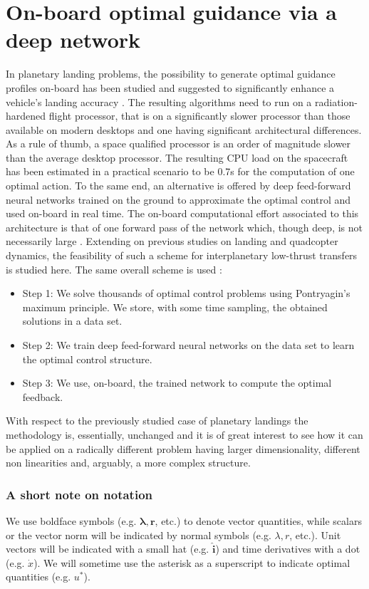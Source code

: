 \documentclass[graybox]{svmult}
\begin{document}
\section{On-board optimal guidance via a deep network}\label{sec:4}
In planetary landing problems, the possibility to generate optimal guidance profiles on-board has been studied and suggested to significantly enhance a vehicle’s landing accuracy \cite{de2012real, dueri2016customized}. The resulting algorithms need to run on a radiation-hardened flight processor, that is on a significantly slower processor than those available on modern desktops and one having significant architectural differences. As a rule of thumb, a space qualified processor is an order of magnitude slower than the average desktop processor. The resulting CPU load on the spacecraft has been estimated in a practical scenario \cite{dueri2016customized} to be 0.7s for the computation of one optimal action. To the same end, an alternative is offered by deep feed-forward neural networks trained on the ground to approximate the optimal control and used on-board in real time. The on-board computational effort associated to this architecture is that of one forward pass of the network which, though deep, is not necessarily large \cite{sanchez2016learning, sanchez2016real}. Extending on previous studies on landing and quadcopter dynamics, the feasibility of such a scheme for interplanetary low-thrust transfers is studied here. The same overall scheme is used \cite{sanchez2016learning}:
\begin{svgraybox}
\begin{itemize}
    \item Step 1: We solve thousands of optimal control problems using Pontryagin's maximum principle. We store, with some time sampling, the obtained solutions in a data set.
    \item Step 2: We train deep feed-forward neural networks on the data set to learn the optimal control structure.
    \item Step 3: We use, on-board, the trained network to compute the optimal feedback.
\end{itemize}
\end{svgraybox}
With respect to the previously studied case of planetary landings the methodology is, essentially, unchanged and it is of great interest to see how it can be applied on a radically different problem having larger dimensionality, different non linearities and, arguably, a more complex structure.

\subsubsection*{A short note on notation}
We use boldface symbols (e.g. $\boldsymbol{\lambda}, \mathbf r$, etc.) to denote vector quantities, while scalars or the vector norm will be indicated by normal symbols (e.g. $\lambda, r$, etc.). Unit vectors will be indicated with a small hat (e.g. $\mathbf{\hat i}$) and time derivatives with a dot (e.g. $\dot x$). We will sometime use the asterisk as a superscript to indicate optimal quantities (e.g. $u^*$).
\end{document}
